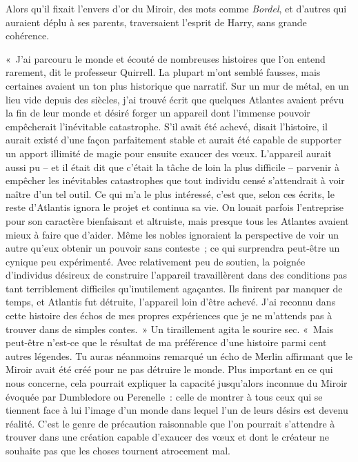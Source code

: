 Alors qu'il fixait l'envers d'or du Miroir, des mots comme \emph{Bordel}, et d'autres qui auraient déplu à ses parents, traversaient l'esprit de Harry, sans grande cohérence.

«~J'ai parcouru le monde et écouté de nombreuses histoires que l'on entend rarement, dit le professeur Quirrell. La plupart m'ont semblé fausses, mais certaines avaient un ton plus historique que narratif. Sur un mur de métal, en un lieu vide depuis des siècles, j'ai trouvé écrit que quelques Atlantes avaient prévu la fin de leur monde et désiré forger un appareil dont l'immense pouvoir empêcherait l'inévitable catastrophe. S'il avait été achevé, disait l'histoire, il aurait existé d'une façon parfaitement stable et aurait été capable de supporter un apport illimité de magie pour ensuite exaucer des vœux. L'appareil aurait aussi pu -- et il était dit que c'était la tâche de loin la plus difficile -- parvenir à empêcher les inévitables catastrophes que tout individu censé s'attendrait à voir naître d'un tel outil. Ce qui m'a le plus intéressé, c'est que, selon ces écrits, le reste d'Atlantis ignora le projet et continua sa vie. On louait parfois l'entreprise pour son caractère bienfaisant et altruiste, mais presque tous les Atlantes avaient mieux à faire que d'aider. Même les nobles ignoraient la perspective de voir un autre qu'eux obtenir un pouvoir sans conteste~; ce qui surprendra peut-être un cynique peu expérimenté. Avec relativement peu de soutien, la poignée d'individus désireux de construire l'appareil travaillèrent dans des conditions pas tant terriblement difficiles qu'inutilement agaçantes. Ils finirent par manquer de temps, et Atlantis fut détruite, l'appareil loin d'être achevé. J'ai reconnu dans cette histoire des échos de mes propres expériences que je ne m'attends pas à trouver dans de simples contes.~» Un tiraillement agita le sourire sec. «~Mais peut-être n'est-ce que le résultat de ma préférence d'une histoire parmi cent autres légendes. Tu auras néanmoins remarqué un écho de Merlin affirmant que le Miroir avait été créé pour ne pas détruire le monde. Plus important en ce qui nous concerne, cela pourrait expliquer la capacité jusqu'alors inconnue du Miroir évoquée par Dumbledore ou Perenelle~: celle de montrer à tous ceux qui se tiennent face à lui l'image d'un monde dans lequel l'un de leurs désirs est devenu réalité. C'est le genre de précaution raisonnable que l'on pourrait s'attendre à trouver dans une création capable d'exaucer des vœux et dont le créateur ne souhaite pas que les choses tournent atrocement mal.

